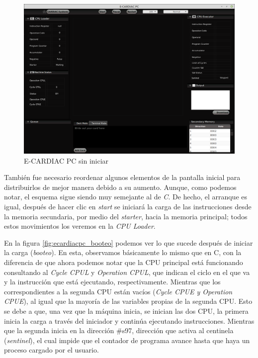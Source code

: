 \documentclass[letterpaper,12pt,oneside]{book}
\begin{document}
			
			\begin{figure}[h]		
				\centering
				\includegraphics[scale=0.48]{media/Paralela/ecaridacpc_sininiciar.png}
				\caption{ E-CARDIAC PC sin iniciar}
				\label{fig:ecaridacpc_sininiciar}
			\end{figure}	

			También fue necesario reordenar algunos elementos de la pantalla inicial para distribuirlos de mejor manera debido
			a su aumento. Aunque, como podemos notar, el esquema sigue siendo muy semejante al de \textit{C}. De hecho, el 
			arranque es igual, después de hacer clic en
			\textit{start} se iniciará la carga de las instrucciones desde la memoria secundaria, por medio del \textit{starter}, hacia la memoria 
			principal; todos estos movimientos los veremos en la \textit{CPU Loader}.

   
			En la figura \ref{fig:ecardiacpc_booteo} podemos ver lo que sucede después de iniciar la carga (\textit{booteo}). 
			En esta, observamos básicamente lo mismo que en C, con
			la diferencia de que ahora podemos notar que la CPU principal está funcionando  consultando al \textit{Cycle CPUL} y
			\textit{Operation CPUL}, que indican el ciclo en el que va y la instrucción que está ejecutando, respectivamente. 
			Mientras que los correspondientes
			a la segunda CPU están vacíos (\textit{Cycle CPUE y Operation CPUE}), al igual que la mayoría de las variables propias de la segunda CPU. 
			Esto 
			se debe a que, una vez que la máquina inicia, se inician
			las dos CPU, la primera inicia la carga  a través del iniciador y continúa ejecutando instrucciones. Mientras que la segunda inicia
			en la dirección \#s97, dirección que activa al centinela (\textit{sentinel}),
			  el cual impide que el contador de programa avance hasta que haya
			un proceso cargado por el usuario.
\end{document}

